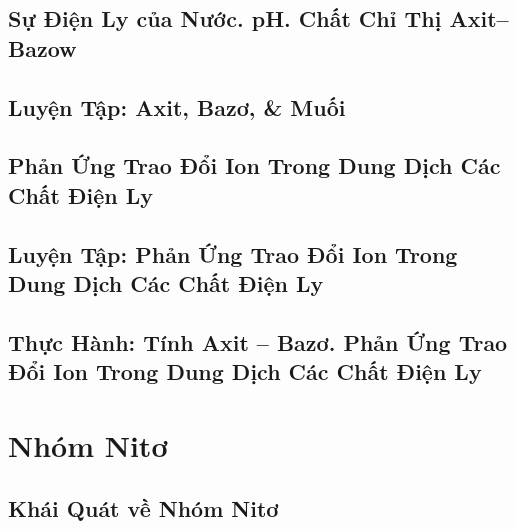 \documentclass[oneside]{book}
\numberwithin{equation}{section}
\begin{document}

\section{Sự Điện Ly của Nước. pH. Chất Chỉ Thị Axit--Bazow}


\section{Luyện Tập: Axit, Bazơ, \& Muối}


\section{Phản Ứng Trao Đổi Ion Trong Dung Dịch Các Chất Điện Ly}


\section{Luyện Tập: Phản Ứng Trao Đổi Ion Trong Dung Dịch Các Chất Điện Ly}


\section{Thực Hành: Tính Axit -- Bazơ. Phản Ứng Trao Đổi Ion Trong Dung Dịch Các Chất Điện Ly}


\chapter{Nhóm Nitơ}

\section{Khái Quát về Nhóm Nitơ}

\end{document}
